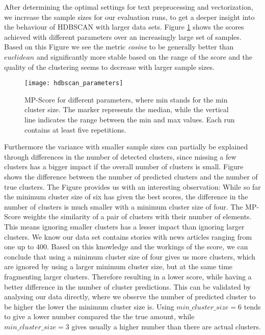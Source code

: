 After determining the optimal settings for text preprocessing and vectorization, we increase the sample sizes for our evaluation runs, to get a deeper insight into the behaviour of HDBSCAN with larger data sets. Figure \ref{fig:hdbscan_parameters} shows the scores achieved with different parameters over an increasingly large set of samples. Based on this Figure we see the metric \textit{cosine} to be generally better than $euclidean$ and significantly more stable based on the range of the score and the quality of the clustering seems to decrease with larger sample sizes.

\begin{figure}[h]
    \centering
    \texttt{[image: hdbscan\_parameters]}
    \caption{MP-Score for different parameters, where min stands for the min cluster size. The marker represents the median, while the vertical line indicates the range between the min and max values. Each run contains at least five repetitions.}
    \label{fig:hdbscan_parameters}
\end{figure}

Furthermore the variance with smaller sample sizes can partially be explained through differences in the number of detected clusters, since missing a few clusters has a bigger impact if the overall number of clusters is small. Figure \label{fig:cluster_difference_samples} shows the difference between the number of predicted clusters and the number of true clusters. The Figure provides us with an interesting observation: While so far the minimum cluster size of six has given the best scores, the difference in the number of clusters is much smaller with a minimum cluster size of four. The MP-Score weights the similarity of a pair of clusters with their number of elements. This means ignoring smaller clusters has a lesser impact than ignoring larger clusters. We know our data set contains stories with news articles ranging from one up to 400. Based on this knowledge and the workings of the score, we can conclude that using a minimum cluster size of four gives us more clusters, which are ignored by using a larger minimum cluster size, but at the same time fragmenting larger clusters. Therefore resulting in a lower score, while having a better difference in the number of cluster predictions. This can be validated by analysing our data directly, where we observe the number of predicted cluster to be higher the lower the minimum cluster size is. Using $min\_cluster\_size=6$ tends to give a lower number compared the the true amount, while $min\_cluster\_size=3$ gives usually a higher number than there are actual clusters.

